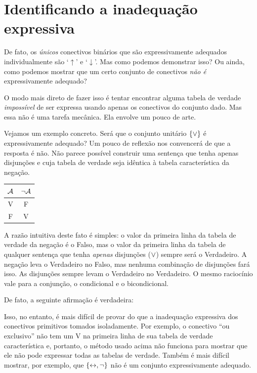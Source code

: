 \section{Identificando a inadequação expressiva}

De fato, os \emph{únicos} conectivos binários que são expressivamente adequados individualmente são `$\uparrow$' e `$\downarrow$'.
Mas como podemos demonstrar isso?
Ou ainda, como podemos mostrar que um certo conjunto de conectivos \emph{não é} expressivamente adequado?
 
O modo mais direto de fazer isso é tentar encontrar alguma tabela de verdade \emph{impossível} de ser expressa usando apenas os conectivos do conjunto dado.
Mas essa não é uma tarefa mecânica.
Ela envolve um pouco de arte.

Vejamos um exemplo concreto.
Será que o conjunto unitário $\{\vee\}$ é expressivamente adequado?
Um pouco de reflexão nos convencerá de que a resposta é não.
Não parece possível construir uma sentença que tenha apenas disjunções e cuja tabela de verdade seja idêntica à tabela característica da negação.
				\begin{center}
				\begin{tabular}{c | c}
				$\mathcal{A}$ & $\neg \mathcal{A}$\\
				\hline
				 V & F \\
				 F & V
				\end{tabular}
				\end{center}
A razão intuitiva deste fato é simples: o valor da primeira linha da tabela de verdade da negação é o  Falso, mas o valor da primeira linha da tabela de qualquer sentença que tenha \emph{apenas} disjunções ($\vee$) sempre será o Verdadeiro.
A negação leva o Verdadeiro no Falso, mas nenhuma combinação de disjunções fará isso.
As disjunções sempre levam o Verdadeiro no Verdadeiro.
O mesmo raciocínio vale para a conjunção, o condicional e o bicondicional.

De fato, a seguinte afirmação é verdadeira:        
        

Isso, no entanto, é mais difícil de provar do que a inadequação expressiva dos conectivos primitivos tomados isoladamente.
Por exemplo, o conectivo ``ou exclusivo'' não tem um V na primeira linha de sua tabela de verdade característica e, portanto, o método usado acima não funciona para mostrar que ele não pode expressar todas as tabelas de verdade.
Também é mais difícil mostrar, por exemplo, que  $\{\leftrightarrow, \neg\}$ não é um conjunto expressivamente adequado.


